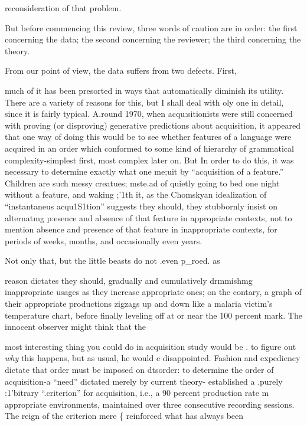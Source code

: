 reconsideration of that problem.


But before commencing this review, three words of caution are in order: the first concerning the data; the second concerning the reviewer; the third concerning the theory.

From our point of view, the data suffers from two defects. First,

much of it has been presorted in ways that automatically diminish its utility. There are a variety of reasons for this, but I shall deal with oly one in detail, since it is fairly typical. A.round 1970, when acqu:si\-tionists were still concerned with proving (or disproving) generative predictions about acquisition, it appeared that one way of doing this would be to see whether features of a language were acquired in an order which conformed to some kind of hierarchy of grammatical complexity-simplest first, most complex later on. But In order to do this, it was necessary to determine exactly what one me;uit by ``acquisition of a feature.'' Children are such messy creatues; mste.ad of quietly going to bed one night without a feature, and waking ;'1th it, as the Chomskyan idealization of ``instantaneus acqu1S1tion'' suggests they should, they stubbornly insist on alternatmg p:esence and absence of that feature in appropriate contexts, not to mention absence and presence of that feature in inappropriate contexts, for periods of weeks, months, and occasionally even years.

Not only that, but the little beasts do not .even p\_roed. as

reason dictates they should, gradually and cumulatively drmmishmg inappropriate usages as they increase appropriate ones; on the contary, a graph of their appropriate productions zigzags up and down like a malaria victim's temperature chart, before finally leveling off at or near the 100 percent mark. The innocent observer might think that the

most interesting thing you could do in acquisition study would be . to figure out \textit{why} this happens, but as usual, he would e disappointed. Fashion and expediency dictate that order must be imposed on dts\-order: to determine the order of acquisition-a ``need'' dictated merely by current theory{}-\citet{Brown1973} established a .purely :1'bitrary ``.cri\-terion'' for acquisition, i.e., a 90 percent production rate m appropriate environments, maintained over three consecutive recording sessions. The reign of the criterion mere \{ reinforced what has always been

